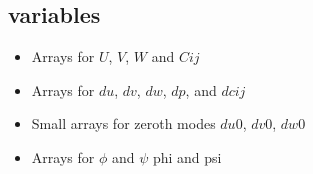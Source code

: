\documentclass[12pt,a4paper]{article}
\begin{document}
\subsection{variables}

\begin{itemize}
    \item Arrays for $U$, $V$, $W$ and $Cij$
    \item Arrays for $du$, $dv$, $dw$, $dp$, and $dcij$
    \item Small arrays for zeroth modes $du0$, $dv0$, $dw0$
    \item Arrays for $\phi$ and $\psi$ phi and psi
\end{itemize}

\end{document}
